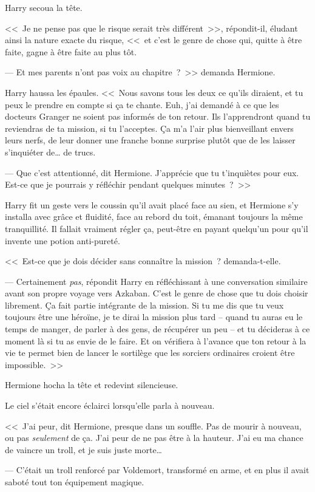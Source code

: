 Harry secoua la tête.

<<~Je ne pense pas que le risque serait très différent~>>, répondit-il, éludant ainsi la nature exacte du risque, <<~et c'est le genre de chose qui, quitte à être faite, gagne à être faite au plus tôt.

--- Et mes parents n'ont pas voix au chapitre~?~>> demanda Hermione.

Harry haussa les épaules. <<~Nous savons tous les deux ce qu'ils diraient, et tu peux le prendre en compte si ça te chante. Euh, j'ai demandé à ce que les docteurs Granger ne soient pas informés de ton retour. Ils l'apprendront quand tu reviendras de ta mission, si tu l'acceptes. Ça m'a l'air plus bienveillant envers leurs nerfs, de leur donner une franche bonne surprise plutôt que de les laisser s'inquiéter de… de trucs.

--- Que c'est attentionné, dit Hermione. J'apprécie que tu t'inquiètes pour eux. Est-ce que je pourrais y réfléchir pendant quelques minutes~?~>>

Harry fit un geste vers le coussin qu'il avait placé face au sien, et Hermione s'y installa avec grâce et fluidité, face au rebord du toit, émanant toujours la même tranquillité. Il fallait vraiment régler ça, peut-être en payant quelqu'un pour qu'il invente une potion anti-pureté.

<<~Est-ce que je dois décider sans connaître la mission~? demanda-t-elle.

--- Certainement \emph{pas}, répondit Harry en réfléchissant à une conversation similaire avant son propre voyage vers Azkaban. C'est le genre de chose que tu dois choisir librement. Ça fait partie intégrante de la mission. Si tu me dis que tu veux toujours être une héroïne, je te dirai la mission plus tard -- quand tu auras eu le temps de manger, de parler à des gens, de récupérer un peu -- et tu décideras à ce moment là si tu as envie de le faire. Et on vérifiera à l'avance que ton retour à la vie te permet bien de lancer le sortilège que les sorciers ordinaires croient être impossible.~>>

Hermione hocha la tête et redevint silencieuse.

Le ciel s'était encore éclairci lorsqu'elle parla à nouveau.

<<~J'ai peur, dit Hermione, presque dans un souffle. Pas de mourir à nouveau, ou pas \emph{seulement} de ça. J'ai peur de ne pas être à la hauteur. J'ai eu ma chance de vaincre un troll, et je suis juste morte…

--- C'était un troll renforcé par Voldemort, transformé en arme, et en plus il avait saboté tout ton équipement magique.

